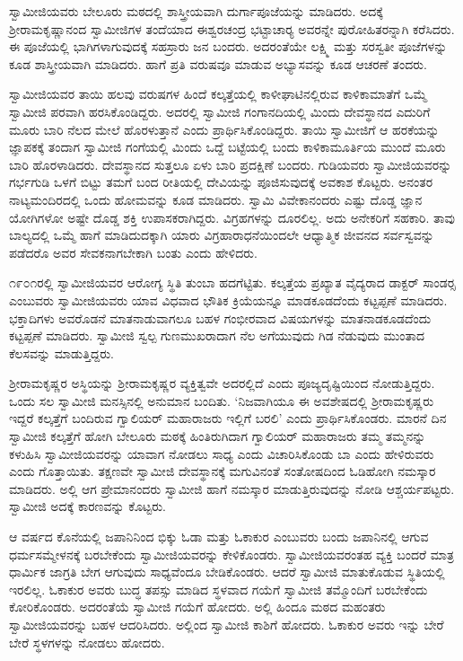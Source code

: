  ಸ್ವಾಮೀಜಿಯವರು ಬೇಲೂರು ಮಠದಲ್ಲಿ ಶಾಸ್ತ್ರೀಯವಾಗಿ ದುರ್ಗಾಪೂಜೆಯನ್ನು ಮಾಡಿದರು. ಅದಕ್ಕೆ ಶ‍್ರೀರಾಮಕೃಷ್ಣಾನಂದ ಸ್ವಾಮೀಜಿಗಳ ತಂದೆಯಾದ ಈಶ್ವರಚಂದ್ರ ಭಟ್ಟಾಚಾರ‍್ಯ ಅವರನ್ನೇ ಪುರೋಹಿತರನ್ನಾಗಿ ಕರೆಸಿದರು. ಈ ಪೂಜೆಯಲ್ಲಿ ಭಾಗಿಗಳಾಗುವುದಕ್ಕೆ ಸಹಸ್ರಾರು ಜನ ಬಂದರು. ಅದರಂತೆಯೇ ಲಕ್ಷ್ಮಿ ಮತ್ತು ಸರಸ್ವತೀ ಪೂಜೆಗಳನ್ನು ಕೂಡ ಶಾಸ್ತ್ರೀಯವಾಗಿ ಮಾಡಿದರು. ಹಾಗೆ ಪ್ರತಿ ವರುಷವೂ ಮಾಡುವ ಅಭ್ಯಾಸವನ್ನು ಕೂಡ ಆಚರಣೆ ತಂದರು. 

 ಸ್ವಾಮೀಜಿಯವರ ತಾಯಿ ಹಲವು ವರುಷಗಳ ಹಿಂದೆ ಕಲ್ಕತ್ತೆಯಲ್ಲಿ ಕಾಳೀಘಾಟಿನಲ್ಲಿರುವ ಕಾಳಿಕಾಮಾತೆಗೆ ಒಮ್ಮೆ ಸ್ವಾಮೀಜಿ ಪರವಾಗಿ ಹರಸಿಕೊಂಡಿದ್ದರು. ಅದರಲ್ಲಿ ಸ್ವಾಮೀಜಿ ಗಂಗಾನದಿಯಲ್ಲಿ ಮಿಂದು ದೇವಸ್ಥಾನದ ಎದುರಿಗೆ ಮೂರು ಬಾರಿ ನೆಲದ ಮೇಲೆ ಹೊರಳುತ್ತಾನೆ ಎಂದು ಪ್ರಾರ್ಥಿಸಿಕೊಂಡಿದ್ದರು. ತಾಯಿ ಸ್ವಾಮೀಜಿಗೆ ಆ ಹರಕೆಯನ್ನು ಜ್ಞಾಪಕಕ್ಕೆ ತಂದಾಗ ಸ್ವಾಮೀಜಿ ಗಂಗೆಯಲ್ಲಿ ಮಿಂದು ಒದ್ದೆ ಬಟ್ಟೆಯಲ್ಲಿ ಬಂದು ಕಾಳಿಕಾಮೂರ್ತಿಯ ಮುಂದೆ ಮೂರು ಬಾರಿ ಹೊರಳಾಡಿದರು. ದೇವಸ್ಥಾನದ ಸುತ್ತಲೂ ಏಳು ಬಾರಿ ಪ್ರದಕ್ಷಿಣೆ ಬಂದರು. ಗುಡಿಯವರು ಸ್ವಾಮೀಜಿಯವರನ್ನು ಗರ್ಭಗುಡಿ ಒಳಗೆ ಬಿಟ್ಟು ತಮಗೆ ಬಂದ ರೀತಿಯಲ್ಲಿ ದೇವಿಯನ್ನು ಪೂಜಿಸುವುದಕ್ಕೆ ಅವಕಾಶ ಕೊಟ್ಟರು. ಅನಂತರ ನಾಟ್ಯಮಂದಿರದಲ್ಲಿ ಒಂದು ಹೋಮವನ್ನು ಕೂಡ ಮಾಡಿದರು. ಸ್ವಾಮಿ ವಿವೇಕಾನಂದರು ಎಷ್ಟು ದೊಡ್ಡ ಜ್ಞಾನ ಯೋಗಿಗಳೋ ಅಷ್ಟೇ ದೊಡ್ಡ ಶಕ್ತಿ ಉಪಾಸಕರಾಗಿದ್ದರು. ವಿಗ್ರಹಗಳನ್ನು ದೂರಲಿಲ್ಲ. ಅದು ಅನೇಕರಿಗೆ ಸಹಕಾರಿ. ತಾವು ಬಾಲ್ಯದಲ್ಲಿ ಒಮ್ಮೆ ಹಾಗೆ ಮಾಡಿದುದಕ್ಕಾಗಿ ಯಾರು ವಿಗ್ರಹಾರಾಧನೆಯಿಂದಲೇ ಆಧ್ಯಾತ್ಮಿಕ ಜೀವನದ ಸರ್ವಸ್ವವನ್ನು ಪಡೆದರೊ ಅವರ ಸೇವಕನಾಗಬೇಕಾಗಿ ಬಂತು ಎಂದು ಹೇಳಿದರು. 

 ೧೯೦೧ರಲ್ಲಿ ಸ್ವಾಮೀಜಿಯವರ ಆರೋಗ್ಯ ಸ್ಥಿತಿ ತುಂಬಾ ಹದಗೆಟ್ಟಿತು. ಕಲ್ಕತ್ತೆಯ ಪ್ರಖ್ಯಾತ ವೈದ್ಯರಾದ ಡಾಕ್ಟರ್ ಸಾಂಡರ‍್ಸ ಎಂಬುವರು ಸ್ವಾಮೀಜಿಯವರು ಯಾವ ವಿಧವಾದ ಭೌತಿಕ ಕ್ರಿಯೆಯನ್ನೂ ಮಾಡಕೂಡದೆಂದು ಕಟ್ಟಪ್ಪಣೆ ಮಾಡಿದರು. ಭಕ್ತಾದಿಗಳು ಅವರೊಡನೆ ಮಾತನಾಡುವಾಗಲೂ ಬಹಳ ಗಂಭೀರವಾದ ವಿಷಯಗಳನ್ನು ಮಾತನಾಡಕೂಡದೆಂದು ಕಟ್ಟಪ್ಪಣೆ ಮಾಡಿದರು. ಸ್ವಾಮೀಜಿ ಸ್ವಲ್ಪ ಗುಣಮುಖರಾದಾಗ ನೆಲ ಅಗೆಯುವುದು ಗಿಡ ನೆಡುವುದು ಮುಂತಾದ ಕೆಲಸವನ್ನು ಮಾಡುತ್ತಿದ್ದರು. 

 ಶ‍್ರೀರಾಮಕೃಷ್ಣರ ಅಸ್ಥಿಯನ್ನು ಶ‍್ರೀರಾಮಕೃಷ್ಣರ ವ್ಯಕ್ತಿತ್ವವೇ ಅದರಲ್ಲಿದೆ ಎಂದು ಪೂಜ್ಯದೃಷ್ಟಿಯಿಂದ ನೋಡುತ್ತಿದ್ದರು. ಒಂದು ಸಲ ಸ್ವಾಮೀಜಿ ಮನಸ್ಸಿನಲ್ಲಿ ಅನುಮಾನ ಬಂದಿತು. ‘ನಿಜವಾಗಿಯೂ ಈ ಅವಶೇಷದಲ್ಲಿ ಶ‍್ರೀರಾಮಕೃಷ್ಣರು ಇದ್ದರೆ ಕಲ್ಕತ್ತೆಗೆ ಬಂದಿರುವ ಗ್ವಾಲಿಯರ್ ಮಹಾರಾಜರು ಇಲ್ಲಿಗೆ ಬರಲಿ’ ಎಂದು ಪ್ರಾರ್ಥಿಸಿಕೊಂಡರು. ಮಾರನೆ ದಿನ ಸ್ವಾಮೀಜಿ ಕಲ್ಕತ್ತೆಗೆ ಹೋಗಿ ಬೇಲೂರು ಮಠಕ್ಕೆ ಹಿಂತಿರುಗಿದಾಗ ಗ್ವಾಲಿಯರ್ ಮಹಾರಾಜರು ತಮ್ಮ ತಮ್ಮನನ್ನು ಕಳುಹಿಸಿ ಸ್ವಾಮೀಜಿಯವರನ್ನು ಯಾವಾಗ ನೋಡಲು ಸಾಧ್ಯ ಎಂದು ವಿಚಾರಿಸಿಕೊಂಡು ಬಾ ಎಂದು ಹೇಳಿರುವರು ಎಂದು ಗೊತ್ತಾಯಿತು. ತಕ್ಷಣವೇ ಸ್ವಾಮೀಜಿ ದೇವಸ್ಥಾನಕ್ಕೆ ಮಗುವಿನಂತೆ ಸಂತೋಷದಿಂದ ಓಡಿಹೋಗಿ ನಮಸ್ಕಾರ ಮಾಡಿದರು. ಅಲ್ಲಿ ಆಗ ಪ್ರೇಮಾನಂದರು ಸ್ವಾಮೀಜಿ ಹಾಗೆ ನಮಸ್ಕಾರ ಮಾಡುತ್ತಿರುವುದನ್ನು ನೋಡಿ ಆಶ್ಚರ್ಯಪಟ್ಟರು. ಸ್ವಾಮೀಜಿ ಅದಕ್ಕೆ ಕಾರಣವನ್ನು ಕೊಟ್ಟರು. 

 ಆ ವರ್ಷದ ಕೊನೆಯಲ್ಲಿ ಜಪಾನಿನಿಂದ ಭಿಕ್ಕು ಓಡಾ ಮತ್ತು ಓಕಾಕುರ ಎಂಬುವರು ಬಂದು ಜಪಾನಿನಲ್ಲಿ ಆಗುವ ಧರ್ಮಸಮ್ಮೇಳನಕ್ಕೆ ಬರಬೇಕೆಂದು ಸ್ವಾಮೀಜಿಯವರನ್ನು ಕೇಳಿಕೊಂಡರು. ಸ್ವಾಮೀಜಿಯವರಂತಹ ವ್ಯಕ್ತಿ ಬಂದರೆ ಮಾತ್ರ ಧಾರ್ಮಿಕ ಜಾಗ್ರತಿ ಬೇಗ ಆಗುವುದು ಸಾಧ್ಯವೆಂದೂ ಬೇಡಿಕೊಂಡರು. ಆದರೆ ಸ್ವಾಮೀಜಿ ಮಾತುಕೊಡುವ ಸ್ಥಿತಿಯಲ್ಲಿ ಇರಲಿಲ್ಲ. ಓಕಾಕುರ ಅವರು ಬುದ್ಧ ತಪಸ್ಸು ಮಾಡಿದ ಸ್ಥಳವಾದ ಗಯೆಗೆ ಸ್ವಾಮೀಜಿ ತಮ್ಮೊಂದಿಗೆ ಬರಬೇಕೆಂದು ಕೋರಿಕೊಂಡರು. ಅದರಂತೆಯೆ ಸ್ವಾಮೀಜಿ ಗಯೆಗೆ ಹೋದರು. ಅಲ್ಲಿ ಹಿಂದೂ ಮಠದ ಮಹಂತರು ಸ್ವಾಮೀಜಿಯವರನ್ನು ಬಹಳ ಆದರಿಸಿದರು. ಅಲ್ಲಿಂದ ಸ್ವಾಮೀಜಿ ಕಾಶಿಗೆ ಹೋದರು. ಓಕಾಕುರ ಅವರು ಇನ್ನು ಬೇರೆ ಬೇರೆ ಸ್ಥಳಗಳನ್ನು ನೋಡಲು ಹೋದರು. 

